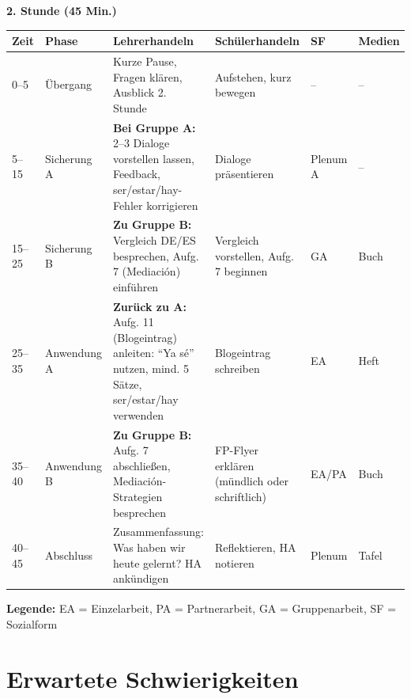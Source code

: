\documentclass[11pt,a4paper]{article}
\begin{document}
\vspace{1em}

\textbf{2. Stunde (45 Min.)}

\begin{longtable}{|p{0.8cm}|p{1.3cm}|p{4.5cm}|p{3cm}|p{1.5cm}|p{2cm}|}
\hline
\textbf{Zeit} & \textbf{Phase} & \textbf{Lehrerhandeln} & \textbf{Schülerhandeln} & \textbf{SF} & \textbf{Medien} \\
\hline
\endhead

0--5 & Übergang & Kurze Pause, Fragen klären, Ausblick 2. Stunde & Aufstehen, kurz bewegen & -- & -- \\
\hline

5--15 & Sicherung A & \textbf{Bei Gruppe A:} 2--3 Dialoge vorstellen lassen, Feedback, ser/estar/hay-Fehler korrigieren & Dialoge präsentieren & Plenum A & -- \\
\hline

15--25 & Sicherung B & \textbf{Zu Gruppe B:} Vergleich DE/ES besprechen, Aufg. 7 (Mediación) einführen & Vergleich vorstellen, Aufg. 7 beginnen & GA & Buch \\
\hline

25--35 & Anwen\-dung A & \textbf{Zurück zu A:} Aufg. 11 (Blogeintrag) anleiten: ``Ya sé'' nutzen, mind. 5 Sätze, ser/estar/hay verwenden & Blogeintrag schreiben & EA & Heft \\
\hline

35--40 & Anwen\-dung B & \textbf{Zu Gruppe B:} Aufg. 7 abschließen, Mediación-Strategien besprechen & FP-Flyer erklären (mündlich oder schriftlich) & EA/PA & Buch \\
\hline

40--45 & Abschluss & Zusammenfassung: Was haben wir heute gelernt? HA ankündigen & Reflektieren, HA notieren & Plenum & Tafel \\
\hline
\end{longtable}

\textbf{Legende:} EA = Einzelarbeit, PA = Partnerarbeit, GA = Gruppenarbeit, SF = Sozialform

\section{Erwartete Schwierigkeiten}
\end{document}
